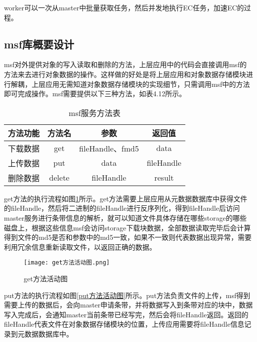worker可以一次从master中批量获取任务，然后并发地执行EC任务，加速EC的过程。

\subsection{msf库概要设计}

msf对外提供对象的写入读取和删除的方法，上层应用中的代码会直接调用msf的方法来去进行对象数据的操作。这样做的好处是将上层应用和对象数据存储模块进行解耦，上层应用无需知道对象数据存储模块的实现细节，只需调用msf中的方法即可完成操作。msf需要提供以下三种方法，如表4.12所示。

\begin{table}[h]
  \centering
  \vspace{10pt}
  \caption{msf服务方法表}
  \vspace{-15pt}
  \begin{tabular}{cccc}
    \toprule
    方法功能   & 方法名    & 参数     & 返回值               \\
    \midrule
    下载数据      & get    & fileHandle、fmd5  & data       \\
    \addlinespace
    上传数据      & put    & data              & fileHandle \\
    \addlinespace
    删除数据      & delete & fileHandle        & result     \\
    \bottomrule
  \end{tabular}
\end{table}	

get方法的执行流程如图\ref{get方法活动图}所示。get方法需要上层应用从元数据数据库中获得文件的fileHandle，然后将二进制的fileHandle进行反序列化，得到fileHandle后访问master服务进行条带信息的解析，就可以知道文件具体存储在哪些storage的哪些磁盘上，根据这些信息msf会访问storage下载块数据，全部数据读取完毕后会计算得到文件的md5是否和参数中的md5一致，如果不一致则代表数据出现异常，需要利用冗余信息重新读取文件，以返回正确的数据。

\begin{figure}[h]
  \centering
  \texttt{[image: get方法活动图.png]}
  \caption{get方法活动图}
  \label{get方法活动图}
\end{figure}

put方法的执行流程如图\ref{put方法活动图}所示。put方法负责文件的上传，msf得到需要上传的数据后，会向master申请条带，并将数据写入到条带对应的块中，数据写入完成后，会通知master当前条带已经写完，然后会将fileHandle返回。返回的fileHandle代表文件在对象数据存储模块的位置，上传应用需要将fileHandle信息记录到元数据数据库中。

